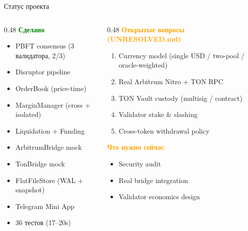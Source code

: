 \documentclass[aspectratio=169]{beamer}
\begin{document}
\begin{frame}{Статус проекта}

\begin{columns}[t]
\begin{column}{0.48\textwidth}
\textcolor{green}{\textbf{Сделано}}
\begin{itemize}
    \item PBFT consensus (3 валидатора, 2/3)
    \item Disruptor pipeline
    \item OrderBook (price-time)
    \item MarginManager (cross + isolated)
    \item Liquidation + Funding
    \item ArbitrumBridge mock
    \item TonBridge mock
    \item FlatFileStore (WAL + snapshot)
    \item Telegram Mini App
    \item 36 тестов (17--20s)
\end{itemize}
\end{column}
\begin{column}{0.48\textwidth}
\textcolor{orange}{\textbf{Открытые вопросы (UNRESOLVED.md)}}
\begin{enumerate}
    \item Currency model (single USD / two-pool / oracle-weighted)
    \item Real Arbitrum Nitro + TON RPC
    \item TON Vault custody (multisig / contract)
    \item Validator stake \& slashing
    \item Cross-token withdrawal policy
\end{enumerate}
\vspace{1em}
\textcolor{orange}{\textbf{Что нужно сейчас}}
\begin{itemize}
    \item Security audit
    \item Real bridge integration
    \item Validator economics design
\end{itemize}
\end{column}
\end{columns}
\end{frame}
\end{document}
